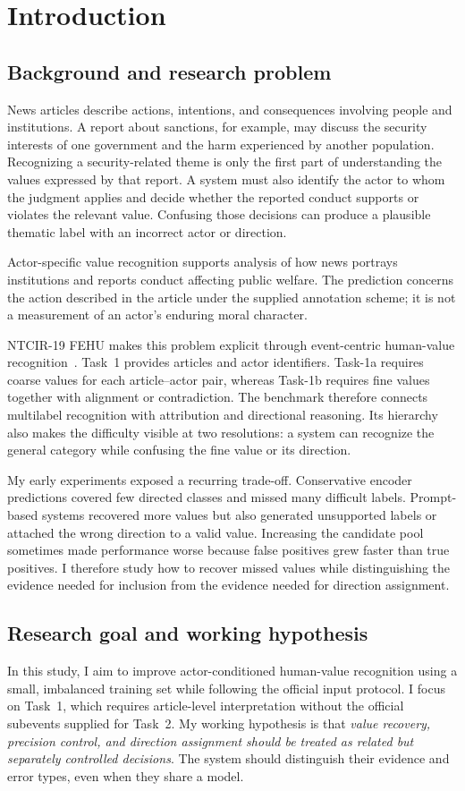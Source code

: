 \documentclass[12pt,a4paper]{article}
\begin{document}
\section{Introduction}
\subsection{Background and research problem}
News articles describe actions, intentions, and consequences involving people and institutions. A report about sanctions, for example, may discuss the security interests of one government and the harm experienced by another population. Recognizing a security-related theme is only the first part of understanding the values expressed by that report. A system must also identify the actor to whom the judgment applies and decide whether the reported conduct supports or violates the relevant value. Confusing those decisions can produce a plausible thematic label with an incorrect actor or direction.

Actor-specific value recognition supports analysis of how news portrays institutions and reports conduct affecting public welfare. The prediction concerns the action described in the article under the supplied annotation scheme; it is not a measurement of an actor's enduring moral character.

NTCIR-19 FEHU makes this problem explicit through event-centric human-value recognition~\cite{fehuoverview}. Task~1 provides articles and actor identifiers. Task-1a requires coarse values for each article--actor pair, whereas Task-1b requires fine values together with alignment or contradiction. The benchmark therefore connects multilabel recognition with attribution and directional reasoning. Its hierarchy also makes the difficulty visible at two resolutions: a system can recognize the general category while confusing the fine value or its direction.

My early experiments exposed a recurring trade-off. Conservative encoder predictions covered few directed classes and missed many difficult labels. Prompt-based systems recovered more values but also generated unsupported labels or attached the wrong direction to a valid value. Increasing the candidate pool sometimes made performance worse because false positives grew faster than true positives. I therefore study how to recover missed values while distinguishing the evidence needed for inclusion from the evidence needed for direction assignment.

\subsection{Research goal and working hypothesis}
In this study, I aim to improve actor-conditioned human-value recognition using a small, imbalanced training set while following the official input protocol. I focus on Task~1, which requires article-level interpretation without the official subevents supplied for Task~2. My working hypothesis is that \emph{value recovery, precision control, and direction assignment should be treated as related but separately controlled decisions}. The system should distinguish their evidence and error types, even when they share a model.
\end{document}
